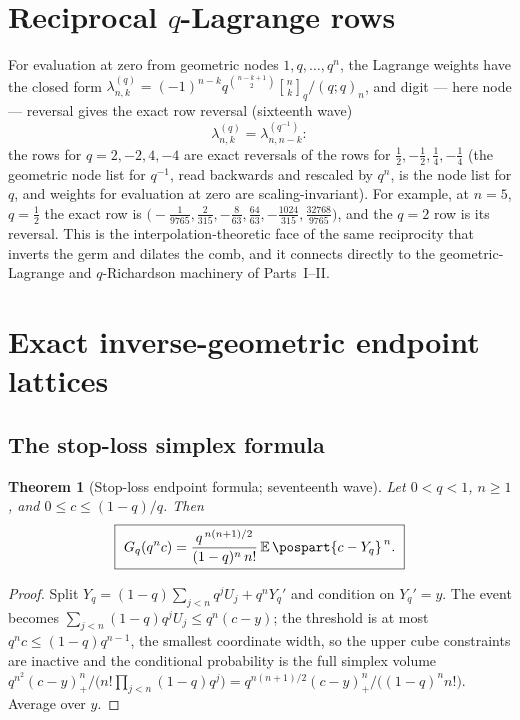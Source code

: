 \documentclass[11pt,oneside]{article}
\numberwithin{equation}{section}
\newtheorem{theorem}{Theorem}[section]
\theoremstyle{definition}
\theoremstyle{remark}
\newcommand{\E}{\mathbb E}
\newcommand{\qbinom}[3]{\genfrac{[}{]}{0pt}{}{#1}{#2}_{#3}}
\begin{document}
\section{Reciprocal \texorpdfstring{$q$}{q}-Lagrange rows}
\label{p7:sec:lagrange}

For evaluation at zero from geometric nodes $1,q,\ldots,q^n$, the Lagrange
weights have the closed form
$\lambda^{(q)}_{n,k}=(-1)^{n-k}q^{\binom{n-k+1}2}\qbinom nkq/(q;q)_n$, and
digit --- here node --- reversal gives the exact row reversal (sixteenth
wave)
\begin{equation}\label{p7:eq:lagrange-reversal}
 \boxed{\ \lambda^{(q)}_{n,k}=\lambda^{(q^{-1})}_{n,n-k}:\ }
\end{equation}
the rows for $q=2,-2,4,-4$ are exact reversals of the rows for
$\tfrac12,-\tfrac12,\tfrac14,-\tfrac14$ (the geometric node list for
$q^{-1}$, read backwards and rescaled by $q^n$, is the node list for $q$, and
weights for evaluation at zero are scaling-invariant).  For example, at
$n=5$, $q=\tfrac12$ the exact row is
$\bigl(-\tfrac1{9765},\tfrac2{315},-\tfrac8{63},\tfrac{64}{63},
-\tfrac{1024}{315},\tfrac{32768}{9765}\bigr)$, and the $q=2$ row is its
reversal.  This is the interpolation-theoretic face of the same reciprocity
that inverts the germ and dilates the comb, and it connects directly to the
geometric-Lagrange and $q$-Richardson machinery of Parts~I--II.
\section{Exact inverse-geometric endpoint lattices}
\label{p7:sec:endpoints}

\subsection{The stop-loss simplex formula}

\begin{theorem}[Stop-loss endpoint formula; seventeenth wave]
\label{p7:thm:stop-loss}
Let $0<q<1$, $n\ge1$, and $0\le c\le(1-q)/q$.  Then
\begin{equation}\label{p7:eq:stop-loss}
 \boxed{\ G_q(q^nc)=
 \frac{q^{\,n(n+1)/2}}{(1-q)^n\,n!}\,
 \E\,\pospart{c-Y_q}^{\,n}.\ }
\end{equation}
\end{theorem}

\begin{proof}
Split $Y_q=(1-q)\sum_{j<n}q^jU_j+q^nY_q'$ and condition on $Y_q'=y$.  The
event becomes $\sum_{j<n}(1-q)q^jU_j\le q^n(c-y)$; the threshold is at most
$q^nc\le(1-q)q^{n-1}$, the smallest coordinate width, so the upper cube
constraints are inactive and the conditional probability is the full simplex
volume
$q^{n^2}(c-y)_+^n/\bigl(n!\prod_{j<n}(1-q)q^j\bigr)
=q^{n(n+1)/2}(c-y)_+^n/\bigl((1-q)^nn!\bigr)$.  Average over $y$.
\end{proof}
\end{document}
